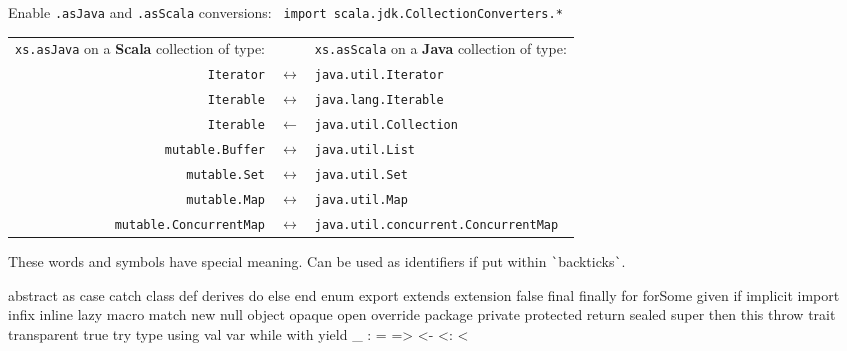 \documentclass[article, a5paper]{memoir}
\newcommand{\LangColor}{red}
\newcommand{\head}[1]{{\bfseries {\color{\LangColor}{#1}}\par\vspace{1mm}\hrule\vspace{-2mm}}}
\newcommand{\code}{\lstinline[basicstyle=\ttfamily]}
\newcommand{\Newline}{\vspace{\baselineskip}}
\begin{document}
{\small
Enable \code{.asJava} and \code{.asScala} conversions: \code{ import scala.jdk.CollectionConverters.* }
\vspace*{0.2em}

\begin{tabular}{@{}r c l}
\texttt{xs.asJava} on a \textbf{Scala} collection of type: & & \texttt{xs.asScala} on a \textbf{Java} collection of type: \\
\texttt{Iterator} &               $\longleftrightarrow$ & \texttt{java.util.Iterator} \\
\texttt{Iterable} &               $\longleftrightarrow$ & \texttt{java.lang.Iterable} \\
\texttt{Iterable} &               $\leftarrow$ & \texttt{java.util.Collection} \\
\texttt{mutable.Buffer} &         $\longleftrightarrow$  & \texttt{java.util.List} \\
\texttt{mutable.Set} &            $\longleftrightarrow$  & \texttt{java.util.Set} \\
\texttt{mutable.Map} &            $\longleftrightarrow$  & \texttt{java.util.Map} \\
\texttt{mutable.ConcurrentMap} &  $\longleftrightarrow$  & \texttt{java.util.concurrent.ConcurrentMap} \\\end{tabular}
}

\Newline\vspace*{-0.5em}\head{Reserved words}\Newline%

{\small These words and symbols have special meaning. Can be used as identifiers if put within \verb|`|backticks\verb|`|.}
\vspace*{-0.5em}
\begin{Code}[morekeywords={macro,\_},otherkeywords={>,<-,\%,<,>:,@,:,=,\#},basicstyle=\ttfamily\fontsize{8}{9}\selectfont]
abstract as case catch class def derives do else end enum export extends extension false 
final finally for forSome given if implicit import infix inline lazy macro match new null 
object opaque open override package private protected return sealed super then this throw 
trait transparent true try type using val var while with yield
 _   :   =   =>   <-   <:   <%
\end{Code}


%
\end{document}
